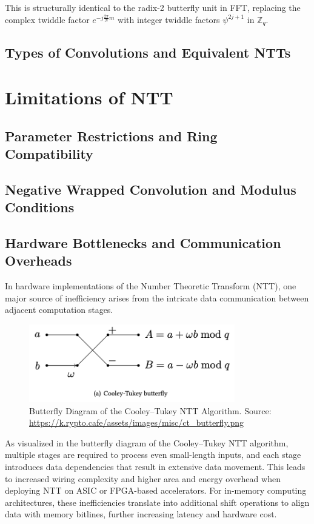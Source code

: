 \documentclass[12pt]{article}
\begin{document}
This is structurally identical to the radix-2 butterfly unit in FFT, 
replacing the complex twiddle factor $e^{-j\frac{2\pi}{N}m}$ with integer twiddle factors $\psi^{2j+1}$ in $\mathbb{Z}_q$.

\subsection{Types of Convolutions and Equivalent NTTs}


\section{Limitations of NTT}

\subsection{Parameter Restrictions and Ring Compatibility}

\subsection{Negative Wrapped Convolution and Modulus Conditions}

\subsection{Hardware Bottlenecks and Communication Overheads}

In hardware implementations of the Number Theoretic Transform (NTT), 
one major source of inefficiency arises from the intricate data communication between adjacent computation stages. 

\begin{figure}[h]
    \centering
    \includegraphics[width=0.8\textwidth]{Final_img/CT_butterfly.png}
    \caption{Butterfly Diagram of the Cooley–Tukey NTT Algorithm. Source: \url{https://k.rypto.cafe/assets/images/misc/ct_butterfly.png}}
    \label{fig:butterfly}
\end{figure}

As visualized in the butterfly diagram of the Cooley–Tukey NTT algorithm, 
multiple stages are required to process even small-length inputs, 
and each stage introduces data dependencies that result in extensive data movement. 
This leads to increased wiring complexity and higher area and energy overhead when deploying NTT on ASIC or FPGA-based accelerators. 
For in-memory computing architectures, 
these inefficiencies translate into additional shift operations to align data with memory bitlines, 
further increasing latency and hardware cost.
\end{document}
